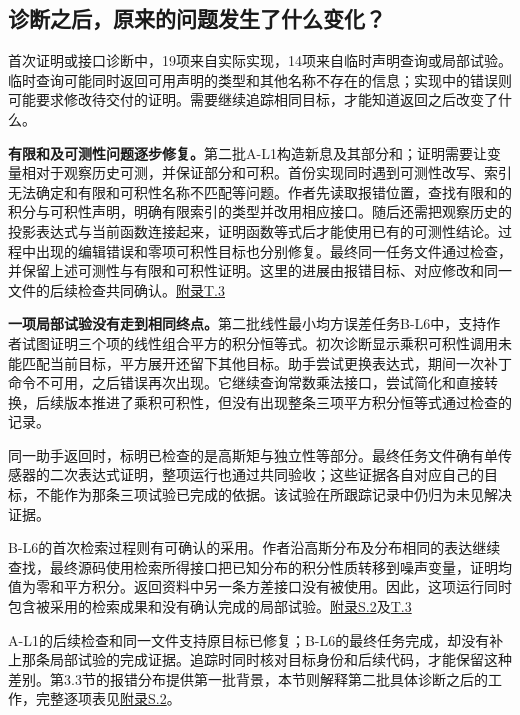 \subsection[诊断之后，原来的问题发生了什么变化？]{\texorpdfstring{\protect\hypertarget{section-5-3}{}诊断之后，原来的问题发生了什么变化？}{诊断之后，原来的问题发生了什么变化？}}
首次证明或接口诊断中，19项来自实际实现，14项来自临时声明查询或局部试验。临时查询可能同时返回可用声明的类型和其他名称不存在的信息；实现中的错误则可能要求修改待交付的证明。需要继续追踪相同目标，才能知道返回之后改变了什么。

\textbf{有限和及可测性问题逐步修复。}第二批A-L1构造新息及其部分和；证明需要让变量相对于观察历史可测，并保证部分和可积。首份实现同时遇到可测性改写、索引无法确定和有限和可积性名称不匹配等问题。作者先读取报错位置，查找有限和的积分与可积性声明，明确有限索引的类型并改用相应接口。随后还需把观察历史的投影表达式与当前函数连接起来，证明函数等式后才能使用已有的可测性结论。过程中出现的编辑错误和零项可积性目标也分别修复。最终同一任务文件通过检查，并保留上述可测性与有限和可积性证明。这里的进展由报错目标、对应修改和同一文件的后续检查共同确认。\href{zh-appendix.pdf\#t3}{附录T.3}

\textbf{一项局部试验没有走到相同终点。}第二批线性最小均方误差任务B-L6中，支持作者试图证明三个项的线性组合平方的积分恒等式。初次诊断显示乘积可积性调用未能匹配当前目标，平方展开还留下其他目标。助手尝试更换表达式，期间一次补丁命令不可用，之后错误再次出现。它继续查询常数乘法接口，尝试简化和直接转换，后续版本推进了乘积可积性，但没有出现整条三项平方积分恒等式通过检查的记录。

同一助手返回时，标明已检查的是高斯矩与独立性等部分。最终任务文件确有单传感器的二次表达式证明，整项运行也通过共同验收；这些证据各自对应自己的目标，不能作为那条三项试验已完成的依据。该试验在所跟踪记录中仍归为未见解决证据。

B-L6的首次检索过程则有可确认的采用。作者沿高斯分布及分布相同的表达继续查找，最终源码使用检索所得接口把已知分布的积分性质转移到噪声变量，证明均值为零和平方积分。返回资料中另一条方差接口没有被使用。因此，这项运行同时包含被采用的检索成果和没有确认完成的局部试验。\href{zh-appendix.pdf\#s2}{附录S.2}及\href{zh-appendix.pdf\#t3}{T.3}

A-L1的后续检查和同一文件支持原目标已修复；B-L6的最终任务完成，却没有补上那条局部试验的完成证据。追踪时同时核对目标身份和后续代码，才能保留这种差别。第3.3节的报错分布提供第一批背景，本节则解释第二批具体诊断之后的工作，完整逐项表见\href{zh-appendix.pdf\#s2}{附录S.2}。

